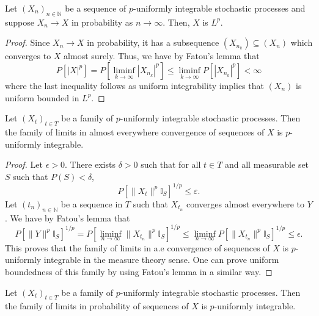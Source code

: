 \begin{lemma}\label{lem:memLp_of_tendstoInMeasure}
  \leanok
  Let $(X_n)_{n \in \mathbb{N}}$ be a sequence of $p$-uniformly integrable stochastic processes and suppose $X_n \to X$
  in probability as $n \to \infty$. Then, $X$ is $L^p$.
\end{lemma}

\begin{proof}
  \leanok
  Since $X_n \to X$ in probability, it has a subsequence $(X_{n_k}) \subseteq (X_n)$ which converges
  to $X$ almost surely. Thus, we have by Fatou's lemma that
  \[P[|X|^p] = P[\liminf_{k \to \infty} |X_{n_k}|^p] \le \liminf_{k \to \infty} P[|X_{n_k}|^p] < \infty\]
  where the last inequality follows as uniform integrability implies that $(X_n)$ is uniform bounded in $L^p$.
\end{proof}

\begin{lemma}\label{lem:uniformIntegrable_of_tendsto_ae}
  \leanok
  Let $(X_t)_{t \in T}$ be a family of $p$-uniformly integrable stochastic processes. Then the family of limits in almost everywhere convergence of sequences of $X$ is $p$-uniformly integrable.
\end{lemma}

\begin{proof}
  \leanok
  Let $\epsilon > 0$. There exists $\delta > 0$ such that for all $t\in T$ and all measurable set $S$ such that $P(S)<\delta$,
  \[P[\|X_t\|^p\mathbb{I}_S]^{1/p}\le \varepsilon.\]
  Let $(t_n)_{n \in \mathbb{N}}$ be a sequence in $T$ such that $X_{t_n}$ converges almost everywhere to $Y$. We have by Fatou's lemma that
  \[P[\|Y\|^p \mathbb{I}_{S}]^{1/p} = P[\liminf_{n \to \infty} \|X_{t_{n}}\|^p \mathbb{I}_{S}]^{1/p} \le \liminf_{n \to \infty} P[\|X_{t_{n}}\|^p \mathbb{I}_{S}]^{1/p} \le \epsilon.\]
  This proves that the family of limits in a.e convergence of sequences of $X$ is $p$-uniformly integrable in the measure theory sense. One can prove uniform boundedness of this family by using Fatou's lemma in a similar way.
\end{proof}

\begin{lemma}\label{lem:uniformIntegrable_of_tendstoInMeasure}
  \leanok
  Let $(X_t)_{t \in T}$ be a family of $p$-uniformly integrable stochastic processes. Then the family of limits in probability of sequences of $X$ is $p$-uniformly integrable.
\end{lemma}

